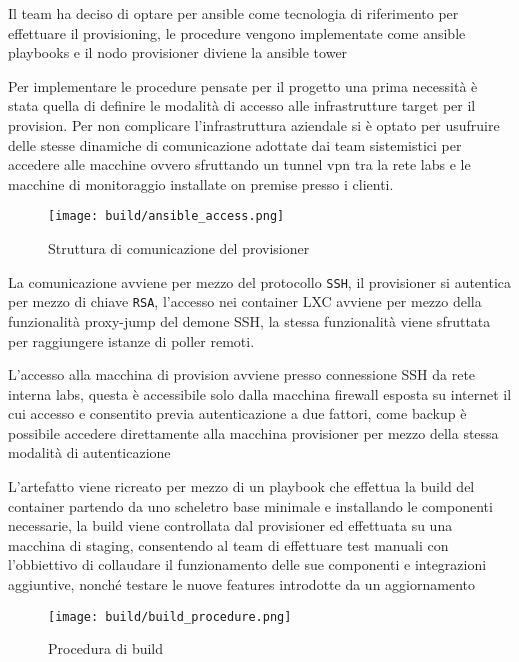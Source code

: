 Il team ha deciso di optare per ansible\cite{ansible} come tecnologia di riferimento per effettuare il provisioning, le procedure vengono implementate come ansible playbooks e il nodo provisioner diviene la ansible tower

Per implementare le procedure pensate per il progetto una prima necessità è stata quella di definire le modalità di accesso alle infrastrutture target per il provision. Per non complicare l'infrastruttura aziendale si è optato per usufruire delle stesse dinamiche di comunicazione adottate dai team sistemistici per accedere alle macchine ovvero sfruttando un tunnel vpn tra la rete labs e le macchine di monitoraggio installate on premise presso i clienti.

\begin{figure}[H]
    \centering
    \texttt{[image: build/ansible\_access.png]}
    \caption{Struttura di comunicazione del provisioner}
    \label{fig:ansible_access}
\end{figure}

La comunicazione avviene per mezzo del protocollo \verb|SSH|, il provisioner si autentica per mezzo di chiave \verb|RSA|, l'accesso nei container LXC avviene per mezzo della funzionalità proxy-jump del demone SSH, la stessa funzionalità viene sfruttata per raggiungere istanze di poller remoti.

L'accesso alla macchina di provision avviene presso connessione SSH da rete interna labs, questa è accessibile solo dalla macchina firewall esposta su internet il cui accesso e consentito previa autenticazione a due fattori, come backup è possibile accedere direttamente alla macchina provisioner per mezzo della stessa modalità di autenticazione

L'artefatto viene ricreato per mezzo di un playbook che effettua la build del container partendo da uno scheletro base minimale e installando le componenti necessarie, la build viene controllata dal provisioner ed effettuata su una macchina di staging, consentendo al team di effettuare test manuali con l'obbiettivo di collaudare il funzionamento delle sue componenti e integrazioni aggiuntive, nonché testare le nuove features introdotte da un aggiornamento

\begin{figure}[H]
    \centering
    \texttt{[image: build/build\_procedure.png]}
    \caption{Procedura di build}
    \label{fig:build_procedure}
\end{figure}

